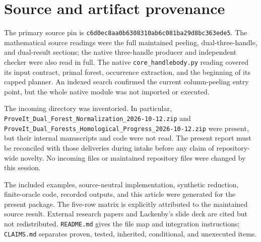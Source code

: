 \documentclass[11pt,letterpaper]{article}
\theoremstyle{definition}
\theoremstyle{remark}
\newcommand{\code}[1]{\nolinkurl{#1}}
\newcommand{\pin}{\texttt{c6d0ec8aa0b6308310ab6c081ba29d8bc363ede5}}
\begin{document}
\section{Source and artifact provenance}
The primary source pin is \pin. The mathematical source readings were the full
maintained peeling, dual-three-handle, and dual-result sections; the native
three-handle producer and independent checker were also read in full. The native
\code{core_handlebody.py} reading covered its input contract, primal forest,
occurrence extraction, and the beginning of its capped planner. An indexed
search confirmed the current column-peeling entry point, but the whole native
module was not imported or executed.

The incoming directory was inventoried. In particular,
\code{ProveIt_Dual_Forest_Normalization_2026-10-12.zip} and
\code{ProveIt_Dual_Forests_Homological_Progress_2026-10-12.zip}
were present, but their internal manuscripts and code were not read. The present
report must be reconciled with those deliveries during intake before any claim
of repository-wide novelty. No incoming files or maintained repository files were
changed by this session.

The included examples, source-neutral implementation, synthetic reduction,
finite-oracle code, recorded outputs, and this article were generated for the
present package. The five-row matrix is explicitly attributed to the maintained
source result. External research papers and Lackenby's slide deck are cited but
not redistributed. \code{README.md} gives the file map and integration
instructions; \code{CLAIMS.md} separates proven, tested, inherited, conditional,
and unexecuted items.
\end{document}
